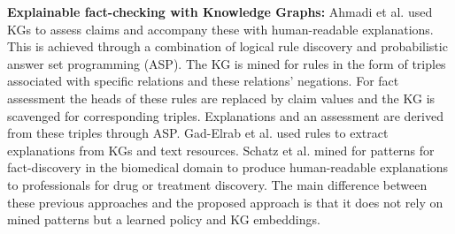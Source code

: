 \noindent \textbf{Explainable fact-checking with Knowledge Graphs: }Ahmadi et al. \cite{Ahmadi2019} used KGs to assess claims and accompany these with human-readable explanations. This is achieved through a combination of logical rule discovery and probabilistic answer set programming (ASP). The KG is mined for rules in the form of triples associated with specific relations and these relations' negations. For fact assessment the heads of these rules are replaced by claim values and the KG is scavenged for corresponding triples. Explanations and an assessment are derived from these triples through ASP. Gad-Elrab et al. \cite{GadElrab2019} used rules to extract explanations from KGs and text resources. Schatz et al. \cite{Schatz2021} mined for patterns for fact-discovery in the biomedical domain to produce human-readable explanations to professionals for drug or treatment discovery. The main difference between these previous approaches and the proposed  approach is that it does not rely on mined patterns but a learned policy and KG embeddings.

